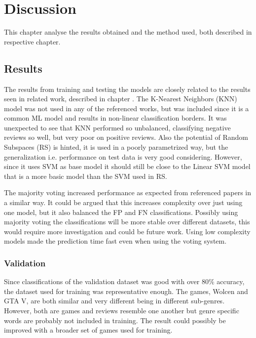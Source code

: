 \chapter{Discussion}
\label{cha:discussion}


This chapter analyse the results obtained and the method used, both described in respective chapter.


\section{Results}
\label{sec:discussion-results}


The results from training and testing the models are closely related to the results seen in related work, described in chapter . 
The K-Nearest Neighbors (KNN) model was not used in any of the referenced works, but was included since it is a common ML model and results in non-linear classification borders. 
It was unexpected to see that KNN performed so unbalanced, classifying negative reviews so well, but very poor on positive reviews. 
Also the potential of Random Subspaces (RS) is hinted, it is used in a poorly parametrized way, but the generalization i.e. performance on test data is very good considering. 
However, since it uses SVM as base model it should still be close to the Linear SVM model that is a more basic model than the SVM used in RS. 


The majority voting increased performance as expected from referenced papers in a similar way. 
It could be argued that this increases complexity over just using one model, but it also balanced the FP and FN classifications. 
Possibly using majority voting the classifications will be more stable over different datasets, this would require more investigation and could be future work. 
Using low complexity models made the prediction time fast even when using the voting system.


\subsection{Validation}
\label{sec:discussion-validation}


Since classifications of the validation dataset was good with over 80\% accuracy, the dataset used for training was representative enough. 
The games, Wolcen and GTA V, are both similar and very different being in different sub-genres. 
However, both are games and reviews resemble one another but genre specific words are probably not included in training. 
The result could possibly be improved with a broader set of games used for training. 


